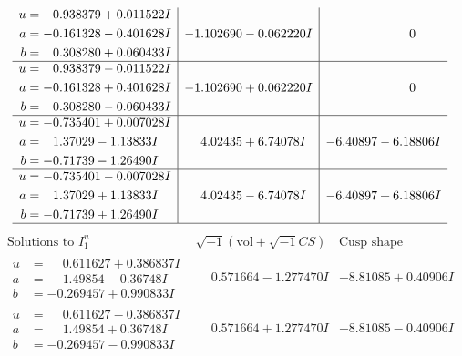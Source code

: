 \documentclass[1p]{elsarticle_modified}
\theoremstyle{definition}
\newcommand{\I}{\sqrt{-1}}
\begin{document}
$$\begin{array}{c|c|c}
\begin{aligned}
u &= \phantom{-}0.938379 + 0.011522 I \\
a &= -0.161328 - 0.401628 I \\
b &= \phantom{-}0.308280 + 0.060433 I\end{aligned}
 & -1.102690 - 0.062220 I & \phantom{-0.000000 } 0 \\ \hline\begin{aligned}
u &= \phantom{-}0.938379 - 0.011522 I \\
a &= -0.161328 + 0.401628 I \\
b &= \phantom{-}0.308280 - 0.060433 I\end{aligned}
 & -1.102690 + 0.062220 I & \phantom{-0.000000 } 0 \\ \hline\begin{aligned}
u &= -0.735401 + 0.007028 I \\
a &= \phantom{-}1.37029 - 1.13833 I \\
b &= -0.71739 - 1.26490 I\end{aligned}
 & \phantom{-}4.02435 + 6.74078 I & -6.40897 - 6.18806 I \\ \hline\begin{aligned}
u &= -0.735401 - 0.007028 I \\
a &= \phantom{-}1.37029 + 1.13833 I \\
b &= -0.71739 + 1.26490 I\end{aligned}
 & \phantom{-}4.02435 - 6.74078 I & -6.40897 + 6.18806 I\\
 \hline 
 \end{array}$$\newpage$$\begin{array}{c|c|c}  
\text{Solutions to }I^u_{1}& \I (\text{vol} + \sqrt{-1}CS) & \text{Cusp shape}\\
 \hline 
\begin{aligned}
u &= \phantom{-}0.611627 + 0.386837 I \\
a &= \phantom{-}1.49854 - 0.36748 I \\
b &= -0.269457 + 0.990833 I\end{aligned}
 & \phantom{-}0.571664 - 1.277470 I & -8.81085 + 0.40906 I \\ \hline\begin{aligned}
u &= \phantom{-}0.611627 - 0.386837 I \\
a &= \phantom{-}1.49854 + 0.36748 I \\
b &= -0.269457 - 0.990833 I\end{aligned}
 & \phantom{-}0.571664 + 1.277470 I & -8.81085 - 0.40906 I \\ \hline\begin{aligned}

\end{aligned}
\end{array}$$
\end{document}
